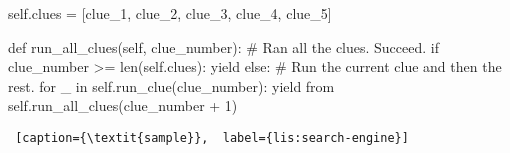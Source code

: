 



\begin{center}
\begin{minipage}[c]{0.46\textwidth}
\begin{python1}
self.clues = [clue_1, clue_2, clue_3, clue_4, clue_5] 

def run_all_clues(self, clue_number):
  # Ran all the clues. Succeed.
  if clue_number >= len(self.clues): yield
  else:
    # Run the current clue and then the rest.
    for _ in self.run_clue(clue_number):
      yield from self.run_all_clues(clue_number + 1)
\end{python1}\linv
\begin{lstlisting} [caption={\textit{sample}},  label={lis:search-engine}]
\end{lstlisting}
\end{minipage}
\end{center}

